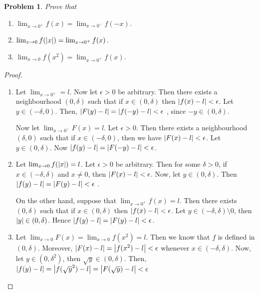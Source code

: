 \documentclass[12pt]{book}
\newcommand\T{\rule{0pt}{2.6ex}}
\newcommand\B{\rule[-1.2ex]{0pt}{0pt}}
\newtheorem*{problem*}{Problem}
\begin{document}
\begin{problem*}
  Prove that
  \begin{enumerate}
  \item $\lim_{x \to 0^+} f(x) = \lim_{ x \to 0^-} f(-x)$.
  \item $\lim_{x \to 0} f(\abs{x}) = \lim_{ x \to 0^+} f(x)$.
  \item $\lim_{x \to 0} f(x^2) = \lim_{ x \to 0^+} f(x)$.
  \end{enumerate}
% 
\end{problem*}

\begin{proof}
  \begin{enumerate}
  \item  Let $\lim_{x \to 0^+} = l $. Now let $\epsilon > 0$ be arbitrary. Then there exists a neighbourhood $(0, \delta)$ such that if $x \in (0, \delta)$ then $\abs{f(x) -l} < \epsilon$. Let $y \in (-\delta , 0)$. Then, $\abs{F(y) - l} = \abs{f(-y) -l } < \epsilon$ , since $-y \in (0, \delta)$.

    \T\B Now let $\lim_{x \to 0^-} F(x) = l$. Let $\epsilon > 0$. Then there
    exists a neighbourhood $(\delta , 0)$ such that if $x \in (-\delta, 0)$,
    then we have $\abs{F(x) -l } < \epsilon$. Let $y \in (0, \delta)$. Now $\abs{f(y) -l } = \abs{F(-y) -l} < \epsilon$.

  \item Let $\lim_{x \to 0} f(\abs{x}) = l$. Let $\epsilon > 0$ be arbitrary. Then for some $\delta > 0$, if $ x \in (-\delta, \delta)$  and $x \ne 0$, then $\abs{F(x) -l } < \epsilon$. Now, let $y \in (0, \delta)$. Then $\abs{f(y) -l } = \abs{F(y) -l} < \epsilon$ .

    \T\B On the other hand, suppose that $\lim_{x \to 0^+}f(x) = l$. Then there exists $(0, \delta)$ such that if $x \in (0, \delta)$ then $\abs{f(x) -l} < \epsilon$. Let $ y \in (-\delta, \delta) \setminus {0}$, then $\abs{y} \in (0, \delta)$. Hence $\abs{f(y) -l} = \abs{F(y) -l} < \epsilon$.

    \item Let $\lim_{x \to 0}F(x) = \lim_{x \to 0}f(x^2) = l$. Then we know that $f$ is defined in $(0, \delta)$. Moreover, $\abs{F(x) -l } = \abs{f(x^2) -l } < \epsilon$ whenever $x \in (-\delta , \delta)$. Now, let $y \in (0, \delta^2)$, then $\sqrt{y} \in (0, \delta)$. Then, $\abs{f(y) -l } = \abs{f(\sqrt{y}^2) -l} = \abs{F(\sqrt{y}) - l} < \epsilon$ 
  \end{enumerate}

\end{proof}
\end{document}
